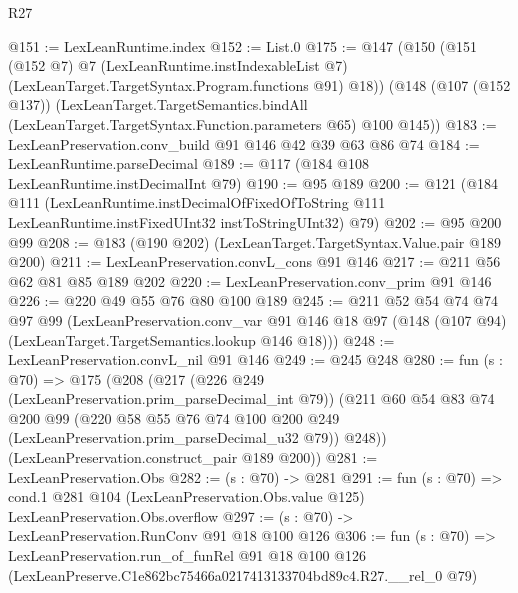 \begin{lexlean}{R27}
\begin{coremodule}
@151 := LexLeanRuntime.index
@152 := List.{0}
@175 := @147
    (@150
      (@151
        (@152 @7)
        @7
        (LexLeanRuntime.instIndexableList @7)
        (LexLeanTarget.TargetSyntax.Program.functions @91)
        @18))
    (@148
      (@107 (@152 @137))
      (LexLeanTarget.TargetSemantics.bindAll
        (LexLeanTarget.TargetSyntax.Function.parameters @65)
        @100
        @145))
@183 := LexLeanPreservation.conv_build @91 @146 @42 @39 @63 @86 @74
@184 := LexLeanRuntime.parseDecimal
@189 := @117 (@184 @108 LexLeanRuntime.instDecimalInt @79)
@190 := @95 @189
@200 := @121
    (@184
      @111
      (LexLeanRuntime.instDecimalOfFixedOfToString
        @111
        LexLeanRuntime.instFixedUInt32
        instToStringUInt32)
      @79)
@202 := @95 @200 @99
@208 := @183 (@190 @202) (LexLeanTarget.TargetSyntax.Value.pair @189 @200)
@211 := LexLeanPreservation.convL_cons @91 @146
@217 := @211 @56 @62 @81 @85 @189 @202
@220 := LexLeanPreservation.conv_prim @91 @146
@226 := @220 @49 @55 @76 @80 @100 @189
@245 := @211
    @52
    @54
    @74
    @74
    @97
    @99
    (LexLeanPreservation.conv_var
      @91
      @146
      @18
      @97
      (@148 (@107 @94) (LexLeanTarget.TargetSemantics.lookup @146 @18)))
@248 := LexLeanPreservation.convL_nil @91 @146
@249 := @245 @248
@280 := fun (s : @70) =>
  @175
    (@208
      (@217
        (@226 @249 (LexLeanPreservation.prim_parseDecimal_int @79))
        (@211
          @60
          @54
          @83
          @74
          @200
          @99
          (@220 @58 @55 @76 @74 @100 @200 @249 (LexLeanPreservation.prim_parseDecimal_u32 @79))
          @248))
      (LexLeanPreservation.construct_pair @189 @200))
@281 := LexLeanPreservation.Obs
@282 := (s : @70) -> @281
@291 := fun (s : @70) =>
  cond.{1} @281 @104 (LexLeanPreservation.Obs.value @125) LexLeanPreservation.Obs.overflow
@297 := (s : @70) -> LexLeanPreservation.RunConv @91 @18 @100 @126
@306 := fun (s : @70) =>
  LexLeanPreservation.run_of_funRel
    @91
    @18
    @100
    @126
    (LexLeanPreserve.C1e862bc75466a0217413133704bd89c4.R27.__rel_0 @79)
\end{coremodule}
\end{lexlean}
